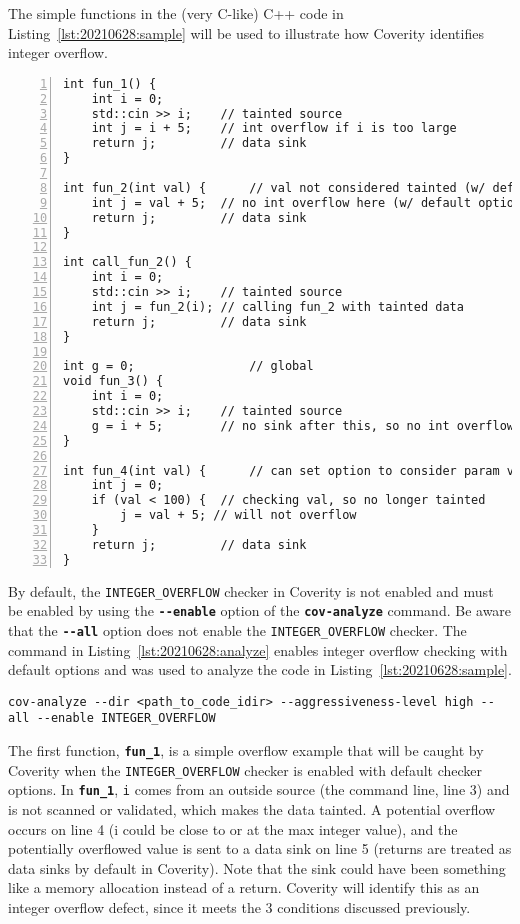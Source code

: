 The simple functions in the (very C-like) C++ code in Listing~\ref{lst:20210628:sample} will be used to illustrate how Coverity identifies integer overflow. 
\begin{lstlisting}[caption={Integer Overflow Examples},captionpos=b,style=CStyle,basicstyle=\small,label={lst:20210628:sample},numbers=left,stepnumber=1]
int fun_1() {
	int i = 0;
	std::cin >> i;    // tainted source
	int j = i + 5;    // int overflow if i is too large
	return j;         // data sink 
}

int fun_2(int val) {      // val not considered tainted (w/ default options)
	int j = val + 5;  // no int overflow here (w/ default options)
	return j;         // data sink 
}

int call_fun_2() {
	int i = 0;
	std::cin >> i;    // tainted source
	int j = fun_2(i); // calling fun_2 with tainted data
	return j;         // data sink 
}

int g = 0;                // global
void fun_3() {
	int i = 0;
	std::cin >> i;    // tainted source
	g = i + 5;        // no sink after this, so no int overflow flagged
}

int fun_4(int val) {      // can set option to consider param val to be tainted
	int j = 0;
	if (val < 100) {  // checking val, so no longer tainted
		j = val + 5; // will not overflow
	}
	return j;         // data sink
}
\end{lstlisting}

By default, the \texttt{INTEGER\_OVERFLOW} checker in Coverity is not enabled and must be enabled by using the \textbf{\texttt{-{}-enable}} option of the \textbf{\texttt{cov-analyze}} command. Be aware that the \textbf{\texttt{-{}-all}} option does not enable the \texttt{INTEGER\_OVERFLOW} checker.\autocite{20210628:coverity} The command in Listing~\ref{lst:20210628:analyze} enables integer overflow checking with default options and was used to analyze the code in Listing~\ref{lst:20210628:sample}.
\begin{lstlisting}[caption={Cov-analyze Parameters},captionpos=b,style=BashStyle,basicstyle=\small,label={lst:20210628:analyze},literate=*{-}{-}1,breaklines=true]
cov-analyze --dir <path_to_code_idir> --aggressiveness-level high --all --enable INTEGER_OVERFLOW
\end{lstlisting}

The first function, \textbf{\texttt{fun\_1}}, is a simple overflow example that will be caught by Coverity when the \texttt{INTEGER\_OVERFLOW} checker is enabled with default checker options. In \textbf{\texttt{fun\_1}}, \texttt{i} comes from an outside source (the command line, line 3) and is not scanned or validated, which makes the data tainted. A potential overflow occurs on line 4 (i could be close to or at the max integer value), and the potentially overflowed value is sent to a data sink on line 5 (returns are treated as data sinks by default in Coverity). Note that the sink could have been something like a memory allocation instead of a return. Coverity will identify this as an integer overflow defect, since it meets the 3 conditions discussed previously.

